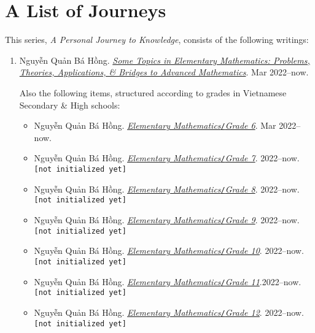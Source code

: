 \documentclass{article}
\numberwithin{equation}{section}
\begin{document}
\section{A List of Journeys}
This series, \textit{A Personal Journey to Knowledge}, consists of the following writings:
\begin{enumerate}
	\item Nguyễn Quản Bá Hồng. \href{https://github.com/NQBH/hobby/blob/master/elementary_mathematics/NQBH_elementary_mathematics.pdf}{\textit{Some Topics in Elementary Mathematics: Problems, Theories, Applications, \& Bridges to Advanced Mathematics}}. Mar 2022--now.
	
	Also the following items, structured according to grades in Vietnamese Secondary \& High schools:
	\begin{itemize}
		\item Nguyễn Quản Bá Hồng. \href{https://github.com/NQBH/hobby/blob/master/elementary_mathematics/grade_6/NQBH_elementary_math_grade_6.pdf}{\textit{Elementary Mathematics}\texttt{/}\textit{Grade 6}}. Mar 2022--now.
		\item Nguyễn Quản Bá Hồng. \href{https://github.com/NQBH/hobby/blob/master/elementary_mathematics/grade_7/NQBH_elementary_math_grade_7.pdf}{\textit{Elementary Mathematics}\texttt{/}\textit{Grade 7}}. 2022--now. \texttt{[not initialized yet]}
		\item Nguyễn Quản Bá Hồng. \href{https://github.com/NQBH/hobby/blob/master/elementary_mathematics/grade_8/NQBH_elementary_math_grade_8.pdf}{\textit{Elementary Mathematics}\texttt{/}\textit{Grade 8}}. 2022--now. \texttt{[not initialized yet]}
		\item Nguyễn Quản Bá Hồng. \href{https://github.com/NQBH/hobby/blob/master/elementary_mathematics/grade_9/NQBH_elementary_math_grade_9.pdf}{\textit{Elementary Mathematics}\texttt{/}\textit{Grade 9}}. 2022--now. \texttt{[not initialized yet]}
		\item Nguyễn Quản Bá Hồng. \href{https://github.com/NQBH/hobby/blob/master/elementary_mathematics/grade_10/NQBH_elementary_math_grade_10.pdf}{\textit{Elementary Mathematics}\texttt{/}\textit{Grade 10}}. 2022--now. \texttt{[not initialized yet]}
		\item Nguyễn Quản Bá Hồng. \href{https://github.com/NQBH/hobby/blob/master/elementary_mathematics/grade_11/NQBH_elementary_math_grade_11.pdf}{\textit{Elementary Mathematics}\texttt{/}\textit{Grade 11}}.2022--now. \texttt{[not initialized yet]}
		\item Nguyễn Quản Bá Hồng. \href{https://github.com/NQBH/hobby/blob/master/elementary_mathematics/grade_12/NQBH_elementary_math_grade_12.pdf}{\textit{Elementary Mathematics}\texttt{/}\textit{Grade 12}}. 2022--now. \texttt{[not initialized yet]}

\end{itemize}
\end{enumerate}
\end{document}
